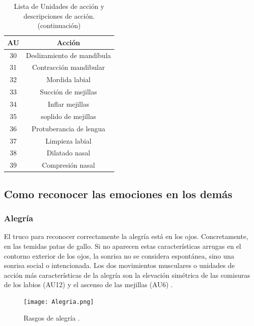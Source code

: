 \begin{table}[H]
\centering
\begin{tabular}{|c|c|}
\hline
\textbf{AU} & \textbf{Acción} \\ \hline
30            & Deslizamiento de mandíbula          \\ \hline
31            & Contracción mandibular              \\ \hline
32            & Mordida labial                      \\ \hline
33            & Succión de mejillas                 \\ \hline
34            & Inflar mejillas                     \\ \hline
35            & soplido de mejillas                 \\ \hline
36            & Protuberancia de lengua             \\ \hline
37            & Limpieza labial                     \\ \hline
38            & Dilatado nasal                      \\ \hline
39            & Compresión nasal                    \\ \hline
\end{tabular}
\caption{Lista de Unidades de acción y descripciones de acción.(continuación)}
    \label{cuadro:AU}
\end{table}

\subsection*{Como reconocer las emociones en los demás}

\subsubsection*{Alegría}
El truco para reconocer correctamente la alegría está en los ojos. Concretamente, en las temidas patas de gallo. Si no aparecen estas características arrugas en el contorno exterior de los ojos, la sonrisa no se considera espontánea, sino una sonrisa social o intencionada. Los dos movimientos musculares o unidades de acción más características de la alegría son la elevación simétrica de las comisuras de los labios (AU12) y el ascenso de las mejillas (AU6) \cite{ReconocerLasEmociones}.

\begin{figure}[h]
    \centering
    \texttt{[image: Alegria.png]}
    \caption{Rasgos de alegría \cite{ReconocerLasEmociones}.}
    \label{fig:Alegria}
\end{figure}


